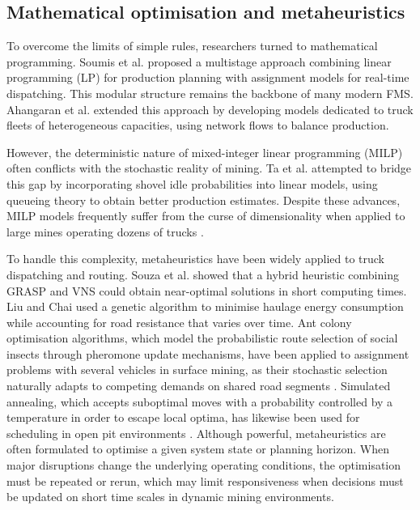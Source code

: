 \documentclass[11pt,a4paper]{article}
\newif\ifcorrmarks
\newcommand{\corr}[1]{\ifcorrmarks\textcolor{corrcolor}{#1}\else#1\fi}
\begin{document}
\subsection{Mathematical optimisation and metaheuristics}

To overcome the limits of simple rules, researchers turned to mathematical programming. Soumis et al. \cite{Soumis1989} proposed a multistage approach combining linear programming (LP) for production planning with assignment models for real-time dispatching. This modular structure remains the backbone of many modern FMS. Ahangaran et al. \cite{Ahangaran2012} extended this approach by developing models dedicated to truck fleets of heterogeneous capacities, using network flows to balance production.

However, the deterministic nature of mixed-integer linear programming (MILP) often conflicts with the stochastic reality of mining. Ta et al. \cite{ChungTa2013} attempted to bridge this gap by incorporating shovel idle probabilities into linear models, using queueing theory to obtain better production estimates. Despite these advances, MILP models frequently suffer from the curse of dimensionality when applied to large mines operating dozens of trucks \cite{AmandaSmith2020, ZhongxinWang2022}.

To handle this complexity, metaheuristics have been widely applied to truck dispatching and routing. Souza et al. \cite{Souza2010} showed that a hybrid heuristic combining GRASP and VNS could obtain near-optimal solutions in short computing times. Liu and Chai \cite{GuangweiLiu2019} used a genetic algorithm to minimise haulage energy consumption while accounting for road resistance that varies over time. Ant colony optimisation algorithms, which model the probabilistic route selection of social insects through pheromone update mechanisms, have been applied to assignment problems with several vehicles in surface mining, as their stochastic selection naturally adapts to competing demands on shared road segments \cite{ShivPrakashUpadhyay2017}. Simulated annealing, which accepts suboptimal moves with a probability controlled by a temperature in order to escape local optima, has likewise been used for scheduling in \corr{open pit} environments \cite{BurakOzdemir2019}. Although powerful, metaheuristics are often formulated to optimise a given system state or planning horizon. When major disruptions change the underlying operating conditions, the optimisation must be repeated or rerun, which may limit responsiveness when decisions must be updated on short time scales in dynamic mining environments.
\end{document}
